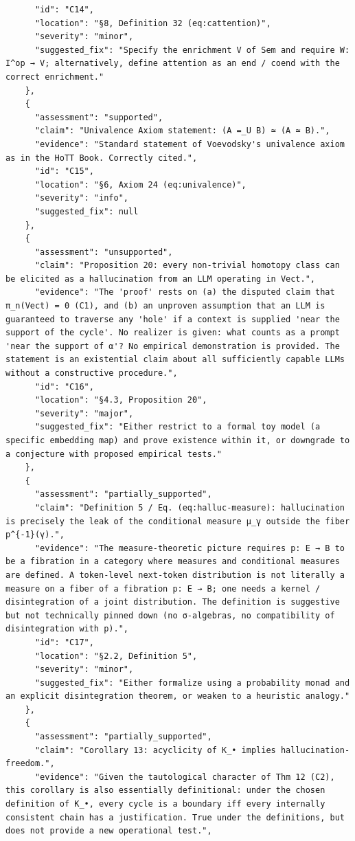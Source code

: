\documentclass[11pt]{article}
\begin{document}
\begin{verbatim}
      "id": "C14",
      "location": "§8, Definition 32 (eq:cattention)",
      "severity": "minor",
      "suggested_fix": "Specify the enrichment V of Sem and require W: I^op → V; alternatively, define attention as an end / coend with the correct enrichment."
    },
    {
      "assessment": "supported",
      "claim": "Univalence Axiom statement: (A =_U B) ≃ (A ≃ B).",
      "evidence": "Standard statement of Voevodsky's univalence axiom as in the HoTT Book. Correctly cited.",
      "id": "C15",
      "location": "§6, Axiom 24 (eq:univalence)",
      "severity": "info",
      "suggested_fix": null
    },
    {
      "assessment": "unsupported",
      "claim": "Proposition 20: every non-trivial homotopy class can be elicited as a hallucination from an LLM operating in Vect.",
      "evidence": "The 'proof' rests on (a) the disputed claim that π_n(Vect) = 0 (C1), and (b) an unproven assumption that an LLM is guaranteed to traverse any 'hole' if a context is supplied 'near the support of the cycle'. No realizer is given: what counts as a prompt 'near the support of α'? No empirical demonstration is provided. The statement is an existential claim about all sufficiently capable LLMs without a constructive procedure.",
      "id": "C16",
      "location": "§4.3, Proposition 20",
      "severity": "major",
      "suggested_fix": "Either restrict to a formal toy model (a specific embedding map) and prove existence within it, or downgrade to a conjecture with proposed empirical tests."
    },
    {
      "assessment": "partially_supported",
      "claim": "Definition 5 / Eq. (eq:halluc-measure): hallucination is precisely the leak of the conditional measure μ_γ outside the fiber p^{-1}(γ).",
      "evidence": "The measure-theoretic picture requires p: E → B to be a fibration in a category where measures and conditional measures are defined. A token-level next-token distribution is not literally a measure on a fiber of a fibration p: E → B; one needs a kernel / disintegration of a joint distribution. The definition is suggestive but not technically pinned down (no σ-algebras, no compatibility of disintegration with p).",
      "id": "C17",
      "location": "§2.2, Definition 5",
      "severity": "minor",
      "suggested_fix": "Either formalize using a probability monad and an explicit disintegration theorem, or weaken to a heuristic analogy."
    },
    {
      "assessment": "partially_supported",
      "claim": "Corollary 13: acyclicity of K_• implies hallucination-freedom.",
      "evidence": "Given the tautological character of Thm 12 (C2), this corollary is also essentially definitional: under the chosen definition of K_•, every cycle is a boundary iff every internally consistent chain has a justification. True under the definitions, but does not provide a new operational test.",

\end{verbatim}
\end{document}
